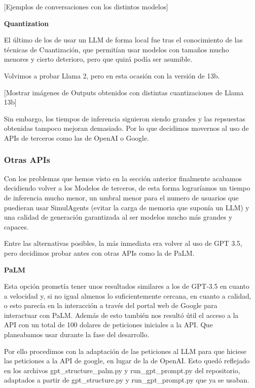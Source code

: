 [Ejemplos de conversaciones con los distintos modelos]

 \textbf{Quantization}

El último de los de usar un LLM de forma local fue tras el conocimiento de las técnicas de Cuantización, que permitían usar modelos con tamaños mucho menores y cierto deterioro, pero que quizá podía ser asumible.

Volvimos a probar Llama 2, pero en esta ocasión con la versión de 13b.

[Mostrar imágenes de Outputs obtenidos con distintas cuantizaciones de Llama 13b]

Sin embargo, los tiempos de inferencia siguieron siendo grandes y las repsuestas obtenidas tampoco mejoran demasiado. Por lo que decidimos movernos al uso de APIs de terceros como las de OpenAI o Google.

\subsubsection{Otras APIs}

Con los problemas que hemos visto en la sección anterior finalmente acabamos decidiendo volver a los Modelos de terceros, de esta forma lograríamos un tiempo de inferencia mucho menor, un umbral menor para el numero de usuarios que puedieran usar SimulAgents (evitar la carga de memoria que suponía un LLM) y una calidad de generación garantizada al ser modelos mucho más grandes y capaces.

Entre las alternativas posibles, la más inmediata era volver al uso de GPT 3.5, pero decidimos probar antes con otras APIs como la de PaLM.

\textbf{PaLM}

Esta opción prometía tener unos resultados similares a los de GPT-3.5 en cuanto a velocidad y, si no igual almenos lo suficientemente cercana, en cuanto a calidad, o esto parecía en la interacción a través del portal web de Google para interactuar con PaLM. Además de esto también nos resultó útil el acceso a la API con un total de 100 dolares de peticiones iniciales a la API. Que planeabamos usar durante la fase del desarrollo.

Por ello procedimos con la adaptación de las peticiones al LLM para que hiciese las peticiones a la API de google, en lugar de la de OpenAI. Esto quedó reflejado en los archivos gpt\_structure\_palm.py y run\_gpt\_prompt.py del repositorio, adaptados a partir de gpt\_structure.py y run\_gpt\_prompt.py que ya se usaban.


